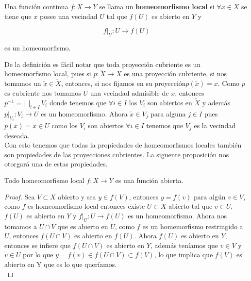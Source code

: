 \begin{definition}\label{HomeoLocal}
Una funci\'on continua $f:X \rightarrow Y$ se llama un \textbf{homeomorfismo local} si $\forall x \in X$ se tiene que $x$ posee una vecindad $U$ tal que $f(U)$ es abierto en $Y$ y

$$f \vert_{U}:U \rightarrow f(U)$$

es un homeomorfismo.\\

\end{definition}
 
De la definici\'on es f\'acil notar que toda proyecci\'on cubriente es un homeomorfismo local, pues si $p:\widetilde{X} \rightarrow X$ es una proyecci\'on cubriente, si nos tomamos un $\widetilde{x} \in \widetilde{X}$, entonces, si nos fijamos en su proyecci\'on$p(\widetilde{x})=x$. Como $p$ es cubriente nos tomamos $U$ una vecindad admisible de $x$, entonces $p^{-1}=\bigsqcup_{i \in I}V_i$ donde tenemos que $\forall i \in I$ los $V_i$ son abiertos en $\widetilde{X}$ y adem\'as $p \vert_{V_i}:V_i \rightarrow U$ es un homeomorfismo. Ahora $\widetilde{x} \in V_j$ para alguna $j \in I$ pues $p(\widetilde{x})=x \in U$ como los $V_i$ son abiertos $\forall i \in I$ tenemos que $V_j$ es la vecindad deseada.\\
Con esto tenemos que todas la propiedades de homeomorfismos locales tambi\'en son propiedades de las proyecciones cubrientes. La siguente proposici\'on nos otorgar\'a una de estas propiedades.\\

\begin{proposition}\label{ProyAb}
Todo homeomorfismo local $f:X \rightarrow Y$ es una funci\'on abierta.\\
\end{proposition}

\begin{proof} 
Sea $V \subset X$ abierto y sea $y \in f(V)$, entonces $y=f(v)$ para alg\'un $v \in V$, como $f$ es homeomorfismo local entonces existe $U \subset X$ abierto tal que $v \in U$, $f(U)$ es abierto en $Y$ y $f \vert_{U}:U \rightarrow f(U)$ es un homeomorfismo. 
Ahora nos tomamos a $U \cap V$ que es abierto en $U$, como $f$ es un homemorfismo restringido a $U$, entonces $f(U \cap V)$ es abierto en $f(U)$. Ahora $f(U)$ es abierto en $Y$, entonces se infiere que $f(U \cap V)$ es abierto en $Y$, adem\'as ten\'iamos que $v \in V$ y $v \in U$ por lo que $y=f(v)\in f(U \cap V) \subset f(V)$, lo que implica que $f(V)$ es abierto en Y que es lo que quer\'iamos.\\
\end{proof}

